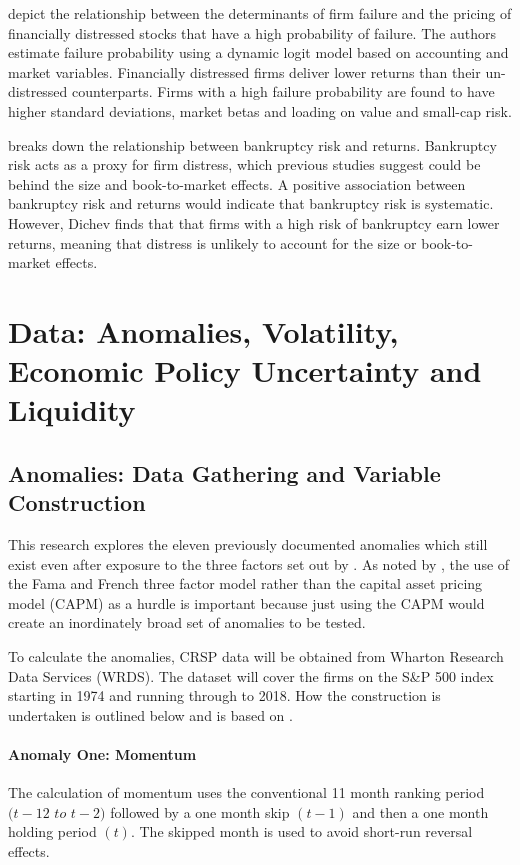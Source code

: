 \documentclass[12pt, a4paper, oneside]{article}
\begin{document}
 depict the relationship between the determinants of firm failure and the pricing of financially distressed stocks that have a high probability of failure. The authors estimate failure probability using a dynamic logit model based on accounting and market variables. Financially distressed firms deliver lower returns than their un-distressed counterparts. Firms with a high failure probability are found to have higher standard deviations, market betas and loading on value and small-cap risk. 

 breaks down the relationship between bankruptcy risk and returns. Bankruptcy risk acts as a proxy for firm distress, which previous studies suggest could be behind the size and book-to-market effects. A positive association between bankruptcy risk and returns would indicate that bankruptcy risk is systematic. However, Dichev finds that that firms with a high risk of bankruptcy earn lower returns, meaning that distress is unlikely to account for the size or book-to-market effects. 

\section{Data: Anomalies, Volatility, Economic Policy Uncertainty and Liquidity}\label{sec:data}
\subsection{Anomalies: Data Gathering and Variable Construction}
This research explores the eleven previously documented anomalies which still exist even after exposure to the three factors set out by . As noted by , the use of the Fama and French three factor model rather than the capital asset pricing model (CAPM) as a hurdle is important because just using the CAPM would create an inordinately broad set of anomalies to be tested. 

To calculate the anomalies, CRSP data will be obtained from Wharton Research Data Services (WRDS). The dataset will cover the firms on the S\&P 500 index starting in 1974 and running through to 2018. How the construction is undertaken is outlined below and is based on .

\paragraph*{Anomaly One: Momentum}
The calculation of momentum uses the conventional 11 month ranking period $(t-12$ $to$ $t-2)$ followed by a one month skip $(t-1)$ and then a one month holding period $(t)$. The skipped month is used to avoid short-run reversal effects.
\end{document}
